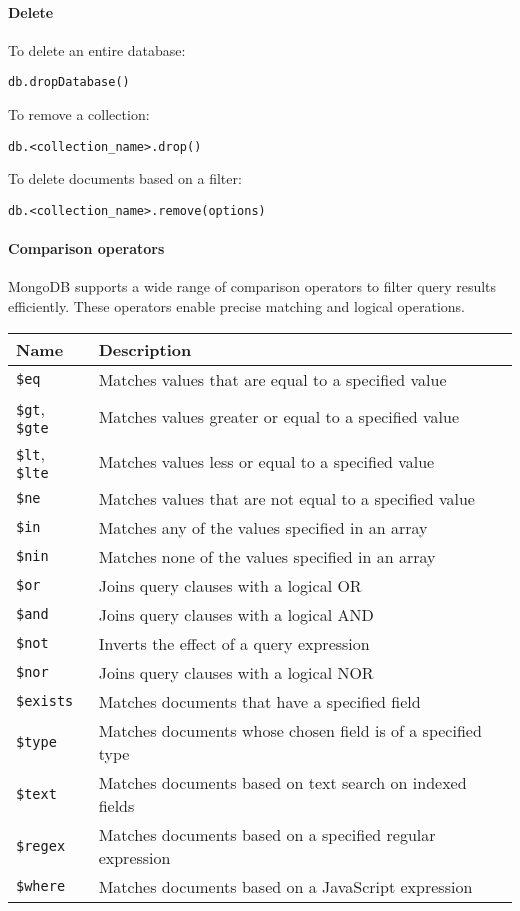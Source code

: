 \paragraph*{Delete}
To delete an entire database:
\begin{lstlisting}[style=MongoDB]
db.dropDatabase()
\end{lstlisting}
To remove a collection:
\begin{lstlisting}[style=MongoDB]
db.<collection_name>.drop()
\end{lstlisting}
To delete documents based on a filter: 
\begin{lstlisting}[style=MongoDB]
db.<collection_name>.remove(options)
\end{lstlisting}

\paragraph*{Comparison operators}
MongoDB supports a wide range of comparison operators to filter query results efficiently. 
These operators enable precise matching and logical operations. 
\begin{longtable}{|l|p{10cm}|}
    \hline \textbf{Name} & \textbf{Description} \\ \hline
    \texttt{\$eq} & Matches values that are equal to a specified value \\ \hline
    \texttt{\$gt}, \texttt{\$gte} & Matches values greater or equal to a specified value \\ \hline
    \texttt{\$lt}, \texttt{\$lte} & Matches values less or equal to a specified value \\ \hline
    \texttt{\$ne} & Matches values that are not equal to a specified value \\ \hline
    \texttt{\$in} & Matches any of the values specified in an array \\ \hline
    \texttt{\$nin} & Matches none of the values specified in an array \\ \hline
    \texttt{\$or} & Joins query clauses with a logical OR \\ \hline
    \texttt{\$and} & Joins query clauses with a logical AND \\ \hline
    \texttt{\$not} & Inverts the effect of a query expression \\ \hline
    \texttt{\$nor} & Joins query clauses with a logical NOR \\ \hline
    \texttt{\$exists} & Matches documents that have a specified field \\ \hline
    \texttt{\$type} & Matches documents whose chosen field is of a specified type \\ \hline
    \texttt{\$text} & Matches documents based on text search on indexed fields \\ \hline
    \texttt{\$regex} & Matches documents based on a specified regular expression \\ \hline
    \texttt{\$where} & Matches documents based on a JavaScript expression \\ \hline
\end{longtable}